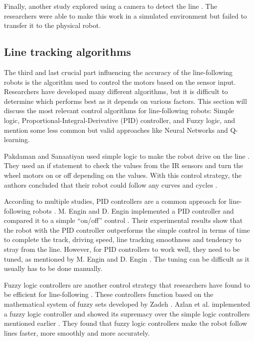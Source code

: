 Finally, another study explored using a camera to detect the line \cite{dupuis}. The researchers were able to make this work in a simulated environment but failed to transfer it to the physical robot.

\subsection{Line tracking algorithms}

The third and last crucial part influencing the accuracy of the line-following robots is the algorithm used to control the motors based on the sensor input. Researchers have developed many different algorithms, but it is difficult to determine which performs best as it depends on various factors. This section will discuss the most relevant control algorithms for line-following robots: Simple logic, Proportional-Integral-Derivative (PID) controller, and Fuzzy logic, and mention some less common but valid approaches like Neural Networks and Q-learning.

Pakdaman and Sanaatiyan used simple logic to make the robot drive on the line \cite{pakdaman}. They used an if statement to check the values from the IR sensors and turn the wheel motors on or off depending on the values. With this control strategy, the authors concluded that their robot could follow any curves and cycles \cite{pakdaman}.

According to multiple studies, PID controllers are a common approach for line-following robots \cite{gomes, ghani, binugroho, engin}. M. Engin and D. Engin  implemented a PID controller and compared it to a simple “on/off” control \cite{engin}. Their experimental results show that the robot with the PID controller outperforms the simple control in terms of time to complete the track, driving speed, line tracking smoothness and tendency to stray from the line. However, for PID controllers to work well, they need to be tuned, as mentioned by M. Engin and D. Engin \cite{engin}. The tuning can be difficult as it usually has to be done manually.

Fuzzy logic controllers are another control strategy that researchers have found to be efficient for line-following \cite{antonelli, azlan, ibrahim, chen}. These controllers function based on the mathematical system of fuzzy sets developed by Zadeh \cite{zadehfuzzy}. Azlan et al. implemented a fuzzy logic controller and showed its supremacy over the simple logic controllers mentioned earlier \cite{azlan}. They found that fuzzy logic controllers make the robot follow lines faster, more smoothly and more accurately.

